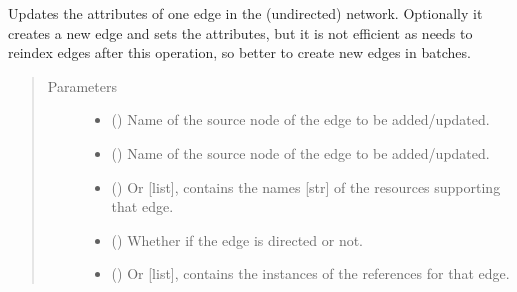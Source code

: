 \documentclass[letterpaper,10pt,english]{sphinxmanual}
\begin{document}
\begin{fulllineitems}
\begin{fulllineitems}
\begin{quote}
\begin{description}
\begin{itemize}
\end{itemize}

\end{description}\end{quote}

\end{fulllineitems}


\begin{fulllineitems}
\label{\detokenize{reference:pypath.main.PyPath.add_update_edge}}
Updates the attributes of one edge in the (undirected) network.
Optionally it creates a new edge and sets the attributes, but it
is not efficient as  needs to reindex edges
after this operation, so better to create new edges in batches.
\begin{quote}\begin{description}
\item[{Parameters}] \leavevmode\begin{itemize}
\item {} 
 () \textendash{} Name of the source node of the edge to be added/updated.

\item {} 
 () \textendash{} Name of the source node of the edge to be added/updated.

\item {} 
 () \textendash{} Or {[}list{]}, contains the names {[}str{]} of the resources
supporting that edge.

\item {} 
 () \textendash{} Whether if the edge is directed or not.

\item {} 
 () \textendash{} Or {[}list{]}, contains the instances of the references
 for that edge.


\end{itemize}
\end{description}
\end{quote}
\end{fulllineitems}
\end{fulllineitems}
\end{document}
